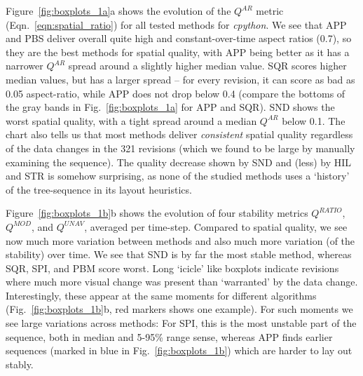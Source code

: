 Figure~\ref{fig:boxplots_1a}a shows the evolution of the $Q^{AR}$ metric (Eqn.~\ref{eqn:spatial_ratio}) for all tested methods for \emph{cpython}. We see that APP and PBS deliver overall quite high and constant-over-time aspect ratios (0.7), so they are the best methods for spatial quality, with APP being better as it has a narrower $Q^{AR}$ spread around a slightly higher median value. SQR scores higher median values, but has a larger spread -- for every revision, it can score as bad as 0.05 aspect-ratio, while APP does not drop below 0.4 (compare the bottoms of the gray bands in Fig.~\ref{fig:boxplots_1a} for APP and SQR). SND shows the worst spatial quality, with a tight spread around a median $Q^{AR}$ below 0.1. The chart also tells us that most methods deliver \emph{consistent} spatial quality regardless of the data changes in the 321 revisions (which we found to be large by manually examining the sequence). The quality decrease shown by SND and (less) by HIL and STR is somehow surprising, as none of the studied methods uses a `history' of the tree-sequence in its layout heuristics.

Figure~\ref{fig:boxplots_1b}b shows the evolution of four stability metrics $Q^{RATIO}$, $Q^{MOD}$, and $Q^{UNAV}$, averaged per time-step. Compared to spatial quality, we see now much more variation between methods and also much more variation (of the stability) over time. We see that SND is by far the most stable method, whereas SQR, SPI, and PBM score worst. Long `icicle' like boxplots indicate revisions where much more visual change was present than `warranted' by the data change. Interestingly, these appear at the same moments for different algorithms (Fig.~\ref{fig:boxplots_1b}b, red markers shows one example). For such moments we see large variations across methods: For SPI, this is the most unstable part of the sequence, both in median and 5-95\% range sense, whereas APP finds earlier sequences (marked in blue in Fig.~\ref{fig:boxplots_1b}) which are harder to lay out stably.

%
%


